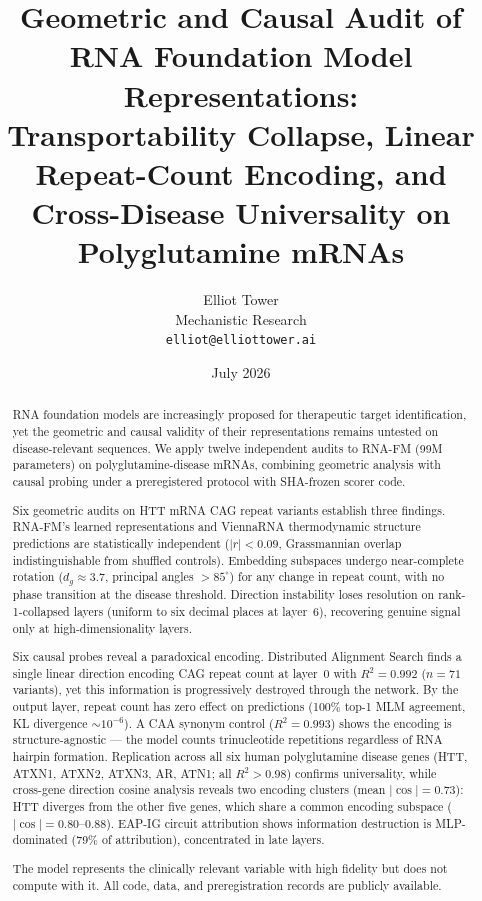 \documentclass[11pt]{article}
\title{Geometric and Causal Audit of RNA Foundation Model Representations:\\
  Transportability Collapse, Linear Repeat-Count Encoding, and\\
  Cross-Disease Universality on Polyglutamine mRNAs}
\author{Elliot Tower\\
  Mechanistic Research\\
  \texttt{elliot@elliottower.ai}}
\date{July 2026}
\begin{document}
\maketitle

\begin{abstract}
RNA foundation models are increasingly proposed for therapeutic target
identification, yet the geometric and causal validity of their
representations remains untested on disease-relevant sequences. We
apply twelve independent audits to RNA-FM (99M parameters) on
polyglutamine-disease mRNAs, combining geometric analysis with causal
probing under a preregistered protocol with SHA-frozen scorer code.

Six geometric audits on HTT mRNA CAG repeat variants establish three
findings. RNA-FM's learned representations and ViennaRNA thermodynamic
structure predictions are statistically independent ($|r| < 0.09$,
Grassmannian overlap indistinguishable from shuffled controls).
Embedding subspaces undergo near-complete rotation ($d_g \approx 3.7$,
principal angles $> 85^\circ$) for any change in repeat count, with no
phase transition at the disease threshold. Direction instability loses
resolution on rank-1-collapsed layers (uniform to six decimal places at
layer~6), recovering genuine signal only at high-dimensionality layers.

Six causal probes reveal a paradoxical encoding. Distributed Alignment
Search finds a single linear direction encoding CAG repeat count at
layer~0 with $R^2 = 0.992$ ($n = 71$ variants), yet this information
is progressively destroyed through the network. By the output layer,
repeat count has zero effect on predictions (100\% top-1 MLM agreement,
KL divergence $\sim 10^{-6}$). A CAA synonym control ($R^2 = 0.993$)
shows the encoding is structure-agnostic --- the model counts
trinucleotide repetitions regardless of RNA hairpin formation.
Replication across all six human polyglutamine disease genes (HTT,
ATXN1, ATXN2, ATXN3, AR, ATN1; all $R^2 > 0.98$) confirms
universality, while cross-gene direction cosine analysis reveals two
encoding clusters (mean $|\cos| = 0.73$): HTT diverges from the other
five genes, which share a common encoding subspace ($|\cos| = 0.80$--$0.88$).
EAP-IG circuit attribution shows information destruction is
MLP-dominated (79\% of attribution), concentrated in late layers.

The model represents the clinically relevant variable with high
fidelity but does not compute with it. All code, data, and
preregistration records are publicly available.
\end{abstract}
\end{document}
